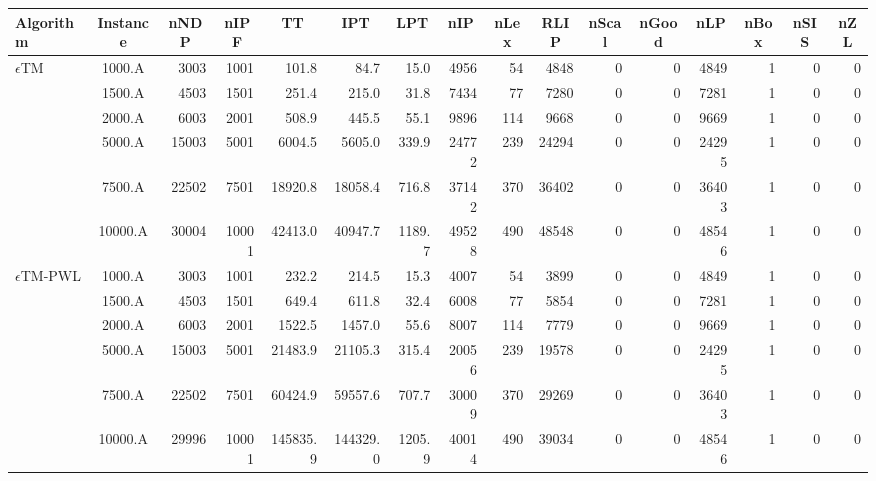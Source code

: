 \documentclass{article}
\begin{document}
\begin{table}[htb]
	\scriptsize
	\centering
	
	\setlength{\tabcolsep}{0.8pt}
	\begin{tabular}{l|c|rr|rrr|rrrrrr|rrr}
		
		\noalign{\smallskip}
		\firsthline
		\noalign{\smallskip}
		
		\textbf{Algorithm} & \textbf{Instance} & \multicolumn{1}{c}{\textbf{nNDP}} & \multicolumn{1}{c|}{\textbf{nIPF}} 
		
		& \multicolumn{1}{c}{\textbf{TT}} & \multicolumn{1}{c}{\textbf{IPT}} & \multicolumn{1}{c|}{\textbf{LPT}} &  \multicolumn{1}{c}{\textbf{nIP}} & \multicolumn{1}{c}{\textbf{nLex}} & \multicolumn{1}{c}{\textbf{RLIP}} & \multicolumn{1}{c}{\textbf{nScal}} & \multicolumn{1}{c}{\textbf{nGood}}
		
		& \multicolumn{1}{c|}{\textbf{nLP}} & \multicolumn{1}{c}{\textbf{nBox}} &  \multicolumn{1}{c}{\textbf{nSIS}} & \multicolumn{1}{c}{\textbf{nZL}}  \\ \hline
		
\hline
$\epsilon$TM & 1000.A & 3003 & 1001 & 101.8 & 84.7 & 15.0 &  4956 & 54 & 4848 & 0 & 0 & 4849 & 1 & 0 & 0 \\
& 1500.A & 4503 & 1501 & 251.4 & 215.0 & 31.8 &  7434 & 77 & 7280 & 0 & 0 & 7281 & 1 & 0 & 0 \\
& 2000.A & 6003 & 2001 & 508.9 & 445.5 & 55.1 &  9896 & 114 & 9668 & 0 & 0 & 9669 & 1 & 0 & 0 \\
& 5000.A & 15003 & 5001 & 6004.5 & 5605.0 & 339.9 &  24772 & 239 & 24294 & 0 & 0 & 24295 & 1 & 0 & 0 \\
& 7500.A & 22502 & 7501 & 18920.8 & 18058.4 & 716.8 &  37142 & 370 & 36402 & 0 & 0 & 36403 & 1 & 0 & 0 \\
& 10000.A & 30004 & 10001 & 42413.0 & 40947.7 & 1189.7 &  49528 & 490 & 48548 & 0 & 0 & 48546 & 1 & 0 & 0 \\
\hline

$\epsilon$TM-PWL & 1000.A & 3003 & 1001 & 232.2 & 214.5 & 15.3 &  4007 & 54 & 3899 & 0 & 0 & 4849 & 1 & 0 & 0 \\
& 1500.A & 4503 & 1501 & 649.4 & 611.8 & 32.4 &  6008 & 77 & 5854 & 0 & 0 & 7281 & 1 & 0 & 0 \\
& 2000.A & 6003 & 2001 & 1522.5 & 1457.0 & 55.6 &  8007 & 114 & 7779 & 0 & 0 & 9669 & 1 & 0 & 0 \\
& 5000.A & 15003 & 5001 & 21483.9 & 21105.3 & 315.4 &  20056 & 239 & 19578 & 0 & 0 & 24295 & 1 & 0 & 0 \\
& 7500.A & 22502 & 7501 & 60424.9 & 59557.6 & 707.7 &  30009 & 370 & 29269 & 0 & 0 & 36403 & 1 & 0 & 0 \\
& 10000.A & 29996 & 10001 & 145835.9 & 144329.0 & 1205.9 &  40014 & 490 & 39034 & 0 & 0 & 48546 & 1 & 0 & 0 \\


\end{tabular}
\end{table}
\end{document}
